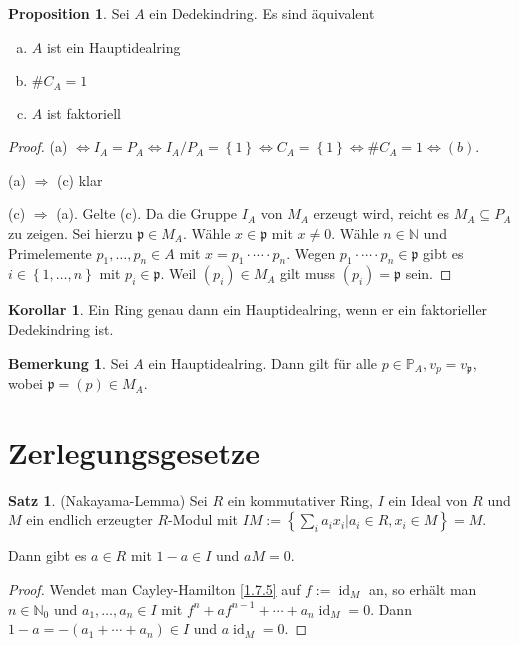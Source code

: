 \documentclass[
twoside=semi,
fontsize=12,
DIV=12, 
cleardoublepage=current,
leqno,
headings=optiontoheadandtoc, 
toc=idx
]{scrbook}
\newcommand{\N}{\mathbb{N}}
\renewcommand{\P}{\mathbb{P}}
\newcommand{\set}[1]{\left\{ #1 \right\}}
\DeclareMathOperator{\id}{id}
\theoremstyle{definition}
\newtheorem{bemerkung}[definition]{Bemerkung}
\newtheorem{satz}[definition]{Satz}
\newtheorem{proposition}[definition]{Proposition}
\newtheorem{korollar}[definition]{Korollar}
\begin{document}
 	\begin{proposition}\label{2.6.7}
 		Sei $A$ ein Dedekindring. Es sind \"aquivalent
 		
 		\begin{enumerate}[(a)]
 			\item $A$ ist ein Hauptidealring
 			
 			\item $\#C_A = 1$
 			
 			\item $A$ ist faktoriell
 		\end{enumerate}
 	
 		\begin{proof}
 			(a) $\Leftrightarrow I_A = P_A \Leftrightarrow I_A / P_A = \set{1} \Leftrightarrow C_A = \set{1} \Leftrightarrow \#C_A = 1 \Leftrightarrow (b)$.
 			
 			(a) $\Rightarrow$ (c) klar
 			
 			(c) $\Rightarrow$ (a). Gelte (c). Da die Gruppe $I_A$ von $M_A$ erzeugt wird, reicht es $M_A \subseteq P_A$ zu zeigen. Sei hierzu $\mathfrak{p} \in M_A$. W\"ahle $x \in \mathfrak{p} $ mit $x \neq 0$. W\"ahle $n \in \N$ und Primelemente $p_1, \dots, p_n \in A$ mit $x = p_1 \cdot \cdots \cdot p_n$. Wegen $p_1 \cdot \cdots \cdot p_n \in \mathfrak{p}$ gibt es $i \in \set{1,\dots, n}$ mit $p_i \in \mathfrak{p}$. Weil $(p_i) \in M_A$ gilt muss $(p_i) = \mathfrak{p}$ sein.		
 		\end{proof}
 	\end{proposition}
 
 	\begin{korollar}\label{2.6.8}
 		Ein Ring genau dann ein Hauptidealring, wenn er ein faktorieller Dedekindring ist.
 	\end{korollar}
 
 	\begin{bemerkung}\label{2.6.9}
 		Sei $A$ ein Hauptidealring. Dann gilt f\"ur alle $p \in \P_A, v_p = v_\mathfrak{p}$, wobei $\mathfrak{p} = (p) \in M_A$.
 	\end{bemerkung}

	\newpage
 	\section{Zerlegungsgesetze}
 	
 	\begin{satz}\label{2.7.1}
 		(Nakayama-Lemma)\newline
 		Sei $R$ ein kommutativer Ring, $I$ ein Ideal von $R$ und $M$ ein endlich erzeugter $R$-Modul mit $IM := \set{\sum_i a_ix_i|a_i \in R, x_i \in M} = M$.
 		
 		Dann gibt es $a \in R$ mit $1-a \in I$ und $aM = 0$.
 		
 		\begin{proof}
 			Wendet man Cayley-Hamilton \ref{1.7.5} auf $f := \id_M$ an, so erh\"alt man $n \in \N_0$ und $a_1, \dots, a_n \in I$ mit $f^n + af^{n-1} + \cdots + a_n\id_M = 0$. Dann $1-a = -(a_1 + \cdots + a_n) \in I$ und $a \id_M = 0$.
 		\end{proof}
 	\end{satz}
 
\end{document}
